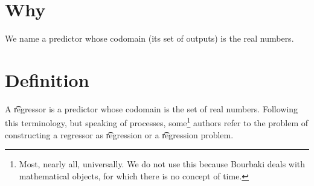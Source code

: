 
\section*{Why}

We name a predictor whose codomain (its set of outputs) is the real numbers.

\section*{Definition}

A \t{regressor} is a predictor whose codomain is the set of real numbers.
Following this terminology, but speaking of processes, some\footnote{Most, nearly all, universally. We do not use this because Bourbaki deals with mathematical objects, for which there is no concept of time.}
authors refer to the problem of constructing a regressor as \t{regression} or a \t{regression problem}.

\blankpage